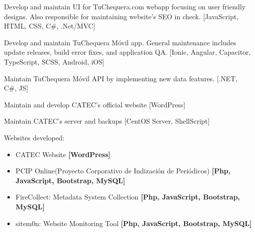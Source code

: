 \documentclass[]{deedy-resume-openfont}
\begin{document}
\sectionsep

\break
{} %
\begin{tightemize}\item Develop and maintain UI for TuChequera.com webapp focusing on user friendly designs. Also responsible for maintaining website's SEO in check. [JavaScript, HTML, CSS, C\#, .Net/MVC]
                  \item Develop and maintain TuChequera Móvil app. General maintenance includes update releases, build error fixes, and application QA. [Ionic, Angular, Capacitor, TypeScript, SCSS, Android, iOS]
                  \item Maintain TuChequera Móvil API by implementing new data features. [.NET, C\#, JS]
\end{tightemize}

\sectionsep

\break
{} %
\begin{tightemize}\item Maintain and develop CATEC's official                            website [WordPress] 
                  \item Maintain CATEC's server and backups [CentOS Server, ShellScript]
                  \item Websites developed:
                    \begin{itemize}
                        \item CATEC Website \textbf{[WordPress]}
                        \item PCIP Online(Proyecto Corporativo de Indización de Periódicos) \textbf{[Php, JavaScript, Bootstrap, MySQL]}
                        \item FireCollect: Metadata System  Collection \textbf{[Php, JavaScript, Bootstrap, MySQL]}
                        \item sitem0n: Website Monitoring Tool \textbf{[Php, JavaScript, Bootstrap, MySQL]}
                    \end{itemize}
\end{tightemize}
\sectionsep
\end{document}
